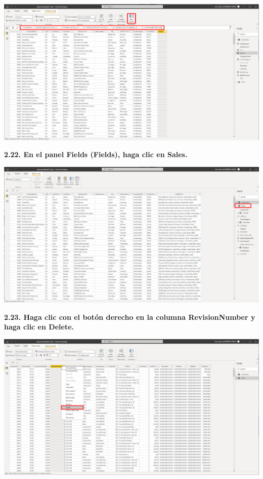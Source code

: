\documentclass{article}
\begin{document}
    \begin{center}
		\includegraphics[width=14cm]{./images/34} 
	\end{center}
	
\textbf{2.22. En el panel \textbf{Fields} \textbf{(Fields)}, haga clic en \textbf{Sales}.}

    \begin{center}
		\includegraphics[width=14cm]{images/35.png} 
	\end{center}
\newpage	
\textbf{2.23. Haga clic con el botón derecho en la columna \textbf{RevisionNumber} y haga clic en \textbf{Delete}.}

    \begin{center}
		\includegraphics[width=14cm]{./images/36} 
	\end{center}
	
\end{document}
